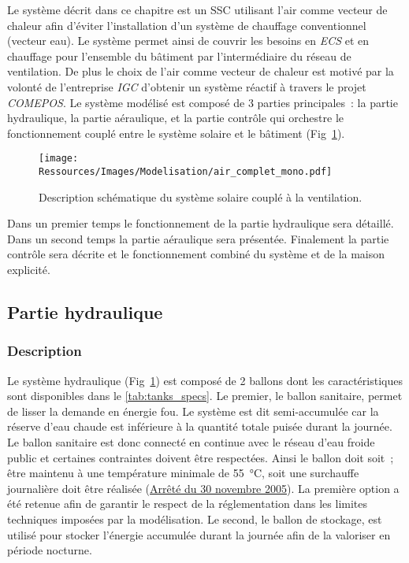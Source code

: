 Le système décrit dans ce chapitre est un SSC utilisant l’air comme vecteur de chaleur
afin d’éviter l’installation d’un système de chauffage conventionnel (vecteur eau). Le
système permet ainsi de couvrir les besoins en \emph{ECS} et en chauffage pour l’ensemble du
bâtiment par l’intermédiaire du réseau de ventilation. De plus le choix de l’air comme
vecteur de chaleur est motivé par la volonté de l’entreprise \emph{IGC} d’obtenir un
système réactif à travers le projet \textit{COMEPOS}.
Le système modélisé est composé de 3 parties principales~: la partie
hydraulique, la partie aéraulique, et la partie contrôle qui orchestre le fonctionnement
couplé entre le système solaire et le bâtiment (Fig~\ref{fig:air_complet_mono}).

\begin{figure}
    \begin{center}
        \texttt{[image: Ressources/Images/Modelisation/air\_complet\_mono.pdf]}
    \end{center}
    \caption{Description schématique du système solaire couplé à la ventilation.
             \label{fig:air_complet_mono}}
\end{figure}

Dans un premier temps le fonctionnement de la partie hydraulique sera détaillé. Dans un
second temps la partie aéraulique sera présentée. Finalement la partie contrôle sera
décrite et le fonctionnement combiné du système et de la maison explicité.


\subsection{Partie hydraulique} %
\label{sub:partie_hydraulique}
\subsubsection{Description} %
\label{ssub:description}
Le système hydraulique (Fig~\ref{fig:air_complet_mono}) est composé de 2 ballons dont les
caractéristiques sont disponibles dans le \autoref{tab:tanks_specs}. Le
premier, le ballon sanitaire, permet de lisser la demande en énergie fou. Le système est
dit semi-accumulée car la réserve d’eau chaude est inférieure à la quantité totale puisée
durant la journée. Le ballon sanitaire est donc connecté en continue avec le réseau d’eau
froide public et certaines contraintes doivent être respectées. Ainsi le ballon doit soit~;
être maintenu à une température minimale de \SI{55}{\celsius}, soit une surchauffe
journalière doit être réalisée
(\href{https://www.legifrance.gouv.fr/affichTexte.do?cidTexte=JORFTEXT000000423756}{Arrêté
du 30 novembre 2005}). La première option a été retenue afin de garantir le respect de la
réglementation dans les limites techniques imposées par la modélisation. Le second, le
ballon de stockage, est utilisé pour stocker l’énergie accumulée durant la journée afin de
la valoriser en période nocturne.

